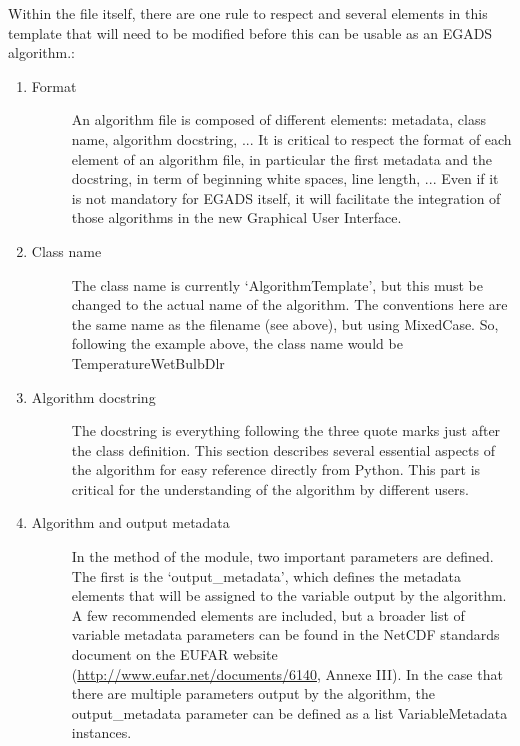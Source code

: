 \documentclass[a4paper,10pt,openany,english]{sphinxmanual}
\begin{document}
Within the file itself, there are one rule to respect and several elements in this template that will need to be modified before this can be usable as an EGADS algorithm.:
\begin{enumerate}
\item {} \begin{description}
\item[{Format}] \leavevmode
An algorithm file is composed of different elements: metadata, class name, algorithm docstring, ... It is critical to respect the format of each element of an algorithm file, in particular the first metadata and the docstring, in term of beginning white spaces, line length, ... Even if it is not mandatory for EGADS itself, it will facilitate the integration of those algorithms in the new Graphical User Interface.

\end{description}

\item {} \begin{description}
\item[{Class name}] \leavevmode
The class name is currently `AlgorithmTemplate', but this must be changed to the actual name of the algorithm. The conventions here are the same name as the filename (see above), but using MixedCase. So, following the example above, the class name would be TemperatureWetBulbDlr

\end{description}

\item {} \begin{description}
\item[{Algorithm docstring}] \leavevmode
The docstring is everything following the three quote marks just after the class definition. This section describes several essential aspects of the algorithm for easy reference directly from Python. This part is critical for the understanding of the algorithm by different users.

\end{description}

\item {} \begin{description}
\item[{Algorithm and output metadata}] \leavevmode
In the  method of the module, two important parameters are defined. The first is the `output\_metadata', which defines the metadata elements that will be assigned to the variable output by the algorithm. A few recommended elements are included, but a broader list of variable metadata parameters can be found in the NetCDF standards document on the EUFAR website (\url{http://www.eufar.net/documents/6140}, Annexe III). In the case that there are multiple parameters output by the algorithm, the output\_metadata parameter can be defined as a list VariableMetadata instances.


\end{description}
\end{enumerate}
\end{document}
